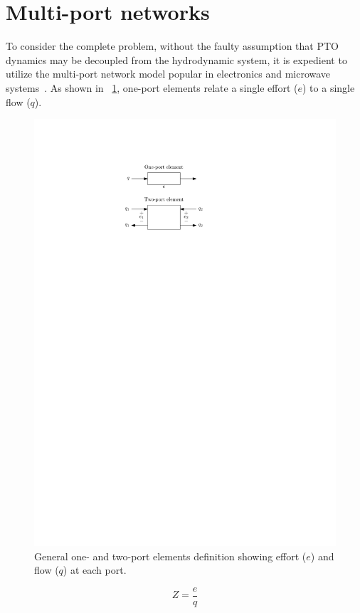\documentclass[lettersize,journal]{IEEEtran}
\begin{document}
\section{Multi-port networks}\label{sec:multi_port_networks}
To consider the complete problem, without the faulty assumption that PTO dynamics may be decoupled from the hydrodynamic system, it is expedient to utilize the multi-port network model popular in electronics and microwave systems~\cite{Marrocco:2008aa,CircuitFundamental}.
As shown in \figurename~\ref{fig:wec_as_multiport_general_one_two_ports}, one-port elements relate a single effort ($e$) to a single flow ($q$).

\begin{figure}[tb]
        \centering
        \includegraphics[width=0.75\columnwidth]{wec_as_multiport_general_one_two_ports.pdf}
        \caption{General one- and two-port elements definition showing effort ($e$) and flow ($q$) at each port.}
        \label{fig:wec_as_multiport_general_one_two_ports}
\end{figure}

\begin{equation}
        Z = \frac{e}{q}
\end{equation}
\end{document}
